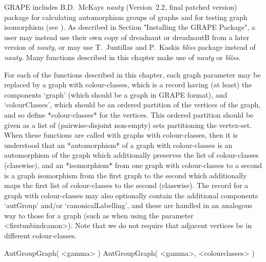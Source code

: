 %
%
%
%
\def\GRAPE{\sf GRAPE}
\def\nauty{\it nauty}
\def\bliss{\it bliss}
\def\G{\Gamma}
\def\Aut{{\rm Aut}\,}
\def\x{\times}

{\GRAPE} includes B.D.~McKay{\pif}s {\nauty} (Version~2.2, final patched
version) package for calculating automorphism groups of graphs and for
testing graph isomorphism (see \cite{Nau90,MP14}).  As described in
Section "Installing the GRAPE Package", a user may instead use their own
copy of dreadnaut or dreadnautB from a later version of {\nauty}, or may
use T.~Juntilla{\pif}s and P.~Kaski{\pif}s {\bliss} package \cite{JK07}
instead of {\nauty}. Many functions described in this chapter make use
of {\nauty} or {\bliss}.


For each of the functions described in this chapter, each graph parameter
may be replaced by a graph with colour-classes, which is a record having
(at least) the components `graph' (which should be a graph in {\GRAPE}
format), and `colourClasses', which should be an ordered partition of the
vertices of the graph, and so define *colour-classes* for the vertices.
This ordered partition should be given as a list of (pairwise-disjoint
non-empty) sets partitioning the vertex-set.  When these functions are
called with graphs with colour-classes, then it is understood that an
*automorphism* of a graph with colour-classes is an automorphism of the
graph which additionally preserves the list of colour-classes (classwise),
and an *isomorphism* from one graph with colour-classes to a second is a
graph isomorphism from the first graph to the second which additionally
maps the first list of colour-classes to the second (classwise). The
record for a graph with colour-classes may also optionally contain the
additional components `autGroup' and/or `canonicalLabelling', and these
are handled in an analogous way to those for a graph (such as when using
the parameter <firstunbindcanon>).  Note that we do not require that
adjacent vertices be in different colour-classes.


\>AutGroupGraph( <gamma> )
\>AutGroupGraph( <gamma>, <colourclasses> )

